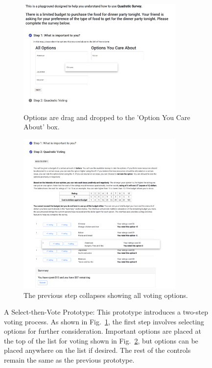 \begin{figure}[h]
    \centering
    \begin{subfigure}[b]{0.47\textwidth}
        \centering
        \includegraphics[width=0.9\textwidth]{content/image/prototypes/3.1_selecting.png}
        \caption{Options are drag and dropped to the 'Option You Care About' box.}
        \label{fig:qv_select_selection}
    \end{subfigure}
    \hfill
    \begin{subfigure}[b]{0.47\textwidth}
        \centering
        \includegraphics[width=0.9\textwidth]{content/image/prototypes/3.2_selecting_2.png}
        \caption{The previous step collapses showing all voting options.}
        \label{fig:qv_select_vote}
    \end{subfigure}
    \caption{A Select-then-Vote Prototype: This prototype introduces a two-step voting process. As shown in Fig.~\ref{fig:qv_select_selection}, the first step involves selecting options for further consideration. Important options are placed at the top of the list for voting shown in Fig.~\ref{fig:qv_select_vote}, but options can be placed anywhere on the list if desired. The rest of the controls remain the same as the previous prototype.}
    \label{fig:qv_select}
\end{figure}

